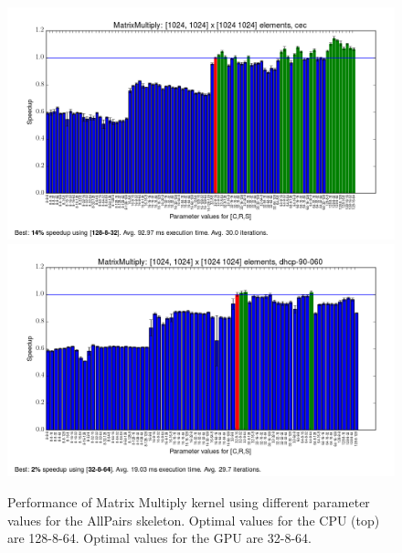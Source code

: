 \begin{figure}[h]
\includegraphics[width=\textwidth]{../../benchmarks/results/e2/MatrixMultiply-1024-1024-1024-cec.png}
\includegraphics[width=\textwidth]{../../benchmarks/results/e2/MatrixMultiply-1024-1024-1024-dhcp-90-060.png}
\caption{Performance of Matrix Multiply kernel using different
  parameter values for the AllPairs skeleton. Optimal values for the
  CPU (top) are 128-8-64. Optimal values for the GPU are 32-8-64.}
\end{figure}

